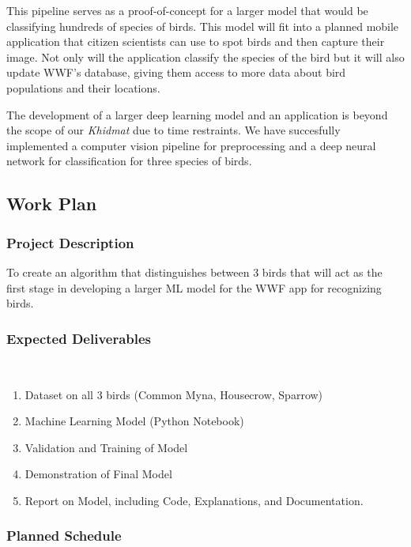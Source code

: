\documentclass[11pt]{article}
\begin{document}
This pipeline serves as a proof-of-concept for a larger model that 
would be classifying hundreds of species of birds. This model will fit 
into a planned mobile application that citizen scientists can use to spot birds 
and then capture their image. Not only will the application classify the 
species of the bird but it will also update WWF's database, giving them 
access to more data about bird populations and their locations. 

The development of a larger deep learning model and an application is 
beyond the scope of our \textit{Khidmat} due to time restraints. 
We have succesfully implemented a computer vision pipeline for preprocessing 
and a deep neural network for classification for three species of birds.

\subsection{Work Plan}
\subsubsection{Project Description}
To create an algorithm that distinguishes between 3 birds that will act as the first stage in developing a larger ML model for the WWF app for recognizing birds.
\subsubsection{Expected Deliverables}
\
\begin{enumerate}
    \item Dataset on all 3 birds (Common Myna, Housecrow, Sparrow) 
    \item Machine Learning Model (Python Notebook)
    \item Validation and Training of Model
    \item Demonstration of Final Model 
    \item Report on Model, including Code, Explanations, and Documentation.
\end{enumerate}

\subsubsection{Planned Schedule}
\end{document}
